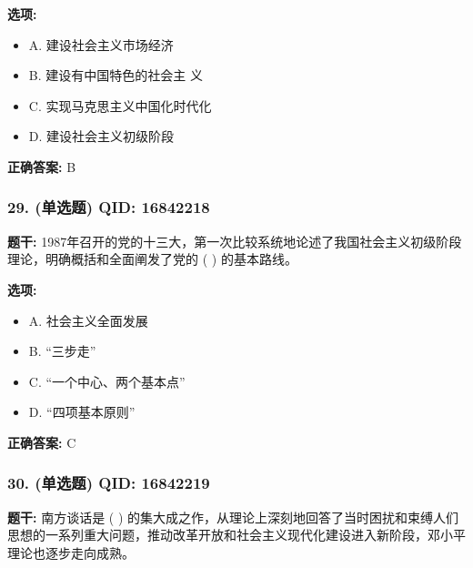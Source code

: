 \documentclass[12pt,UTF8]{ctexart}
\begin{document}
\textbf{选项:}
\begin{itemize}[leftmargin=*]

  \item A. 建设社会主义市场经济

  \item B. 建设有中国特色的社会主 义

  \item C. 实现马克思主义中国化时代化

  \item D. 建设社会主义初级阶段

\end{itemize}

\textbf{正确答案:}
B

\vspace{0.3em}\hrulefill\vspace{0.7em}

\subsubsection*{29. (单选题) \small QID: 16842218}

\textbf{题干:}
1987年召开的党的十三大，第一次比较系统地论述了我国社会主义初级阶段理论，明确概括和全面阐发了党的 ( ) 的基本路线。

\textbf{选项:}
\begin{itemize}[leftmargin=*]

  \item A. 社会主义全面发展

  \item B. “三步走”

  \item C. “一个中心、两个基本点”

  \item D. “四项基本原则”

\end{itemize}

\textbf{正确答案:}
C

\vspace{0.3em}\hrulefill\vspace{0.7em}

\subsubsection*{30. (单选题) \small QID: 16842219}

\textbf{题干:}
南方谈话是 ( ) 的集大成之作，从理论上深刻地回答了当时困扰和束缚人们思想的一系列重大问题，推动改革开放和社会主义现代化建设进入新阶段，邓小平理论也逐步走向成熟。
\end{document}
